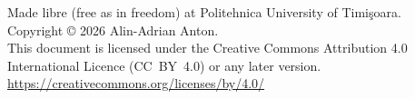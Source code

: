 \documentclass[11pt,a4paper]{article}
\begin{document}
\vfill
\begin{center}\small
\textcolor{ldgray}{%
Made \copyleft{} libre (free as in freedom) at
Politehnica University of Timi\c{s}oara.\\
Copyright \copyright{} 2026 Alin-Adrian Anton.\\
This document is licensed under the Creative Commons Attribution 4.0
International Licence (CC~BY~4.0) or any later version.\\
\url{https://creativecommons.org/licenses/by/4.0/}}
\end{center}
\end{document}
